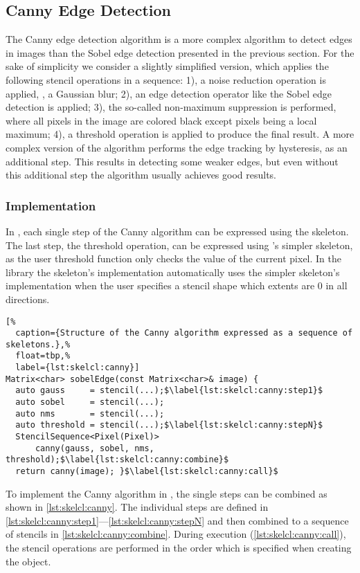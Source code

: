 \subsection{Canny Edge Detection}
The Canny edge detection algorithm is a more complex algorithm to detect edges in images than the Sobel edge detection presented in the previous section.
For the sake of simplicity we consider a slightly simplified version, which applies the following stencil operations in a sequence:
1), a noise reduction operation is applied, \eg, a Gaussian blur;
2), an edge detection operator like the Sobel edge detection is applied;
3), the so-called non-maximum suppression is performed, where all pixels in the image are colored black except pixels being a local maximum;
4), a threshold operation is applied to produce the final result.
A more complex version of the algorithm performs the edge tracking by hysteresis, as an additional step.
This results in detecting some weaker edges, but even without this additional step the algorithm usually achieves good results.


\subsubsection*{\SkelCL Implementation}
In \SkelCL, each single step of the Canny algorithm can be expressed using the \stencil skeleton.
The last step, the threshold operation, can be expressed using \SkelCL's simpler \map skeleton, as the user threshold function only checks the value of the current pixel.
In the \SkelCL library the  skeleton's implementation automatically uses the simpler \map skeleton's implementation when the user specifies a stencil shape which extents are $0$ in all directions.

\begin{lstlisting}[%
  caption={Structure of the Canny algorithm expressed as a sequence of skeletons.},%
  float=tbp,%
  label={lst:skelcl:canny}]
Matrix<char> sobelEdge(const Matrix<char>& image) {
  auto gauss     = stencil(...);$\label{lst:skelcl:canny:step1}$
  auto sobel     = stencil(...);
  auto nms       = stencil(...);
  auto threshold = stencil(...);$\label{lst:skelcl:canny:stepN}$
  StencilSequence<Pixel(Pixel)>
      canny(gauss, sobel, nms, threshold);$\label{lst:skelcl:canny:combine}$
  return canny(image); }$\label{lst:skelcl:canny:call}$
\end{lstlisting}

To implement the Canny algorithm in \SkelCL, the single steps can be combined as shown in \autoref{lst:skelcl:canny}.
The individual steps are defined in \autoref{lst:skelcl:canny:step1}---\autoref{lst:skelcl:canny:stepN} and then combined to a sequence of stencils in \autoref{lst:skelcl:canny:combine}.
During execution (\autoref{lst:skelcl:canny:call}), the stencil operations are performed in the order which is specified when creating the  object.

